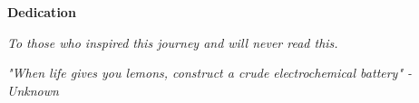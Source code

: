 \thispagestyle{empty}
\vspace*{\fill}

\begin{center}
\fontsize{16pt}{24pt}\selectfont \textbf{Dedication}
\end{center}
\fontsize{12pt}{24pt}\selectfont \emph{To those who inspired this journey and will never read this.}
\vspace*{\fill}

\newpage
\thispagestyle{empty}
\vspace*{\fill}
\begin{center}
\fontsize{12pt}{24pt}\selectfont \emph{"When life gives you lemons, construct a crude electrochemical battery" - Unknown}
\end{center}
\vspace*{\fill}